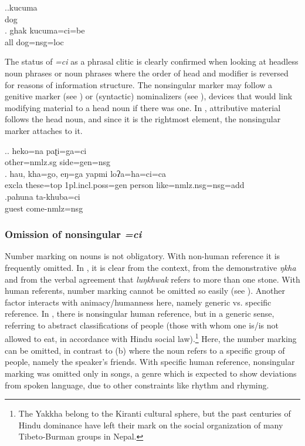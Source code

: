 \ex.\ag.kucuma\\
dog\\
\bg. ghak kucuma=ci=be\\
all dog{\sc =nsg=loc}\\

The status of \emph{=ci} as a phrasal clitic is clearly confirmed when looking at headless noun phrases or noun phrases where the order of head and modifier is reversed for reasons  of information structure. The nonsingular marker may follow a genitive marker (see \Next[a]) or (syntactic) nominalizers (see \Next[b]), devices that would link modifying material to a head noun if there was one. In \Next[c], attributive material follows the head noun, and since it is the rightmost element, the nonsingular marker attaches to it.

\ex.\ag. heko=na         paʈi=ga=ci\\
other{\sc =nmlz.sg} side{\sc =gen=nsg}\\
  
\bg. hau,  kha=go,      eŋ=ga              yapmi  loʔa=ha=ci=ca\\
  {\sc excla} these{\sc =top} {\sc 1pl.incl.poss=gen} person like{\sc =nmlz.nsg=nsg=add}\\
    
 \bg.pahuna ta-khuba=ci\\
guest come{\sc -nmlz=nsg}\\
  
 
\subsubsection{Omission of nonsingular \emph{=ci}}\label{number-1}

Number marking on nouns is not obligatory. With non-human  reference it is frequently omitted.  In \Next[a], it is clear from the context, from the demonstrative \emph{ŋkha} and from the verbal agreement that \emph{luŋkhwak} refers to more than one stone. With human referents, number marking cannot be omitted so easily (see \Next[b]). Another factor interacts with animacy/humanness here, namely generic vs. specific reference. In \Next[c], there is nonsingular human reference, but in a generic sense, referring to abstract classifications of people (those with whom one is/is not allowed to eat, in accordance with Hindu social law).\footnote{The Yakkha belong to the Kiranti cultural sphere, but the past centuries of Hindu dominance have left their mark on the social organization of many Tibeto-Burman groups in Nepal.} Here, the number marking can be omitted, in contrast to  (b) where the noun refers to a specific group of people, namely the speaker's friends. With specific human reference, nonsingular marking was omitted only in songs, a genre which is expected to show deviations from spoken language, due to other constraints like rhythm and rhyming.


